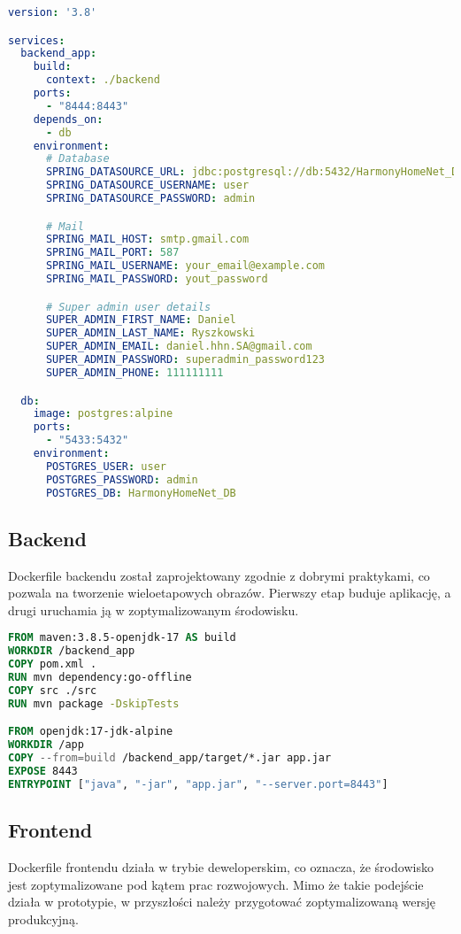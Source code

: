 \begin{lstlisting}[language=yaml, caption=Fragment pliku \texttt{docker-compose.yml}]
version: '3.8'

services:
  backend_app:
    build:
      context: ./backend
    ports:
      - "8444:8443"
    depends_on:
      - db
    environment:
      # Database
      SPRING_DATASOURCE_URL: jdbc:postgresql://db:5432/HarmonyHomeNet_DB
      SPRING_DATASOURCE_USERNAME: user
      SPRING_DATASOURCE_PASSWORD: admin

      # Mail
      SPRING_MAIL_HOST: smtp.gmail.com
      SPRING_MAIL_PORT: 587
      SPRING_MAIL_USERNAME: your_email@example.com
      SPRING_MAIL_PASSWORD: yout_password

      # Super admin user details
      SUPER_ADMIN_FIRST_NAME: Daniel
      SUPER_ADMIN_LAST_NAME: Ryszkowski
      SUPER_ADMIN_EMAIL: daniel.hhn.SA@gmail.com
      SUPER_ADMIN_PASSWORD: superadmin_password123
      SUPER_ADMIN_PHONE: 111111111

  db:
    image: postgres:alpine
    ports:
      - "5433:5432"
    environment:
      POSTGRES_USER: user
      POSTGRES_PASSWORD: admin
      POSTGRES_DB: HarmonyHomeNet_DB
\end{lstlisting}

\subsection{Backend}

Dockerfile backendu został zaprojektowany zgodnie z dobrymi praktykami, co pozwala na tworzenie wieloetapowych obrazów. Pierwszy etap buduje aplikację, a drugi uruchamia ją w zoptymalizowanym środowisku.

\begin{lstlisting}[language=Dockerfile, caption=Dockerfile backendu]
FROM maven:3.8.5-openjdk-17 AS build
WORKDIR /backend_app
COPY pom.xml .
RUN mvn dependency:go-offline
COPY src ./src
RUN mvn package -DskipTests

FROM openjdk:17-jdk-alpine
WORKDIR /app
COPY --from=build /backend_app/target/*.jar app.jar
EXPOSE 8443
ENTRYPOINT ["java", "-jar", "app.jar", "--server.port=8443"]
\end{lstlisting}

\subsection{Frontend}

Dockerfile frontendu działa w trybie deweloperskim, co oznacza, że środowisko jest zoptymalizowane pod kątem prac rozwojowych. Mimo że takie podejście działa w prototypie, w przyszłości należy przygotować zoptymalizowaną wersję produkcyjną.

